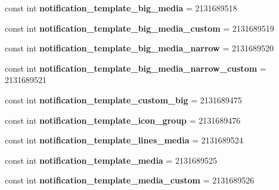 \begin{DoxyCompactItemize}
const int {\bfseries notification\+\_\+template\+\_\+big\+\_\+media} = 2131689518
\item 
\mbox{\label{classst_delivery_1_1_resource_1_1_layout_a74bc9923f45f25757e4d6ca1f4bee195}} 
const int {\bfseries notification\+\_\+template\+\_\+big\+\_\+media\+\_\+custom} = 2131689519
\item 
\mbox{\label{classst_delivery_1_1_resource_1_1_layout_afa76fe3140003e3059556030e24b266f}} 
const int {\bfseries notification\+\_\+template\+\_\+big\+\_\+media\+\_\+narrow} = 2131689520
\item 
\mbox{\label{classst_delivery_1_1_resource_1_1_layout_aa16cad60465fd9f461d30979c4a8de5d}} 
const int {\bfseries notification\+\_\+template\+\_\+big\+\_\+media\+\_\+narrow\+\_\+custom} = 2131689521
\item 
\mbox{\label{classst_delivery_1_1_resource_1_1_layout_a4e13b812d9fa03ff539879780fd55b9c}} 
const int {\bfseries notification\+\_\+template\+\_\+custom\+\_\+big} = 2131689475
\item 
\mbox{\label{classst_delivery_1_1_resource_1_1_layout_a366eb7b4d3f1929b20ea334dc36a16b7}} 
const int {\bfseries notification\+\_\+template\+\_\+icon\+\_\+group} = 2131689476
\item 
\mbox{\label{classst_delivery_1_1_resource_1_1_layout_a7f0f7b1c94d9ed79bfc7ce9c47d4f56e}} 
const int {\bfseries notification\+\_\+template\+\_\+lines\+\_\+media} = 2131689524
\item 
\mbox{\label{classst_delivery_1_1_resource_1_1_layout_a18e853700ee2ba961a45e1debd1a5eb4}} 
const int {\bfseries notification\+\_\+template\+\_\+media} = 2131689525
\item 
\mbox{\label{classst_delivery_1_1_resource_1_1_layout_ac59f13f61cab3ea4e9a9415a38ac0c54}} 
const int {\bfseries notification\+\_\+template\+\_\+media\+\_\+custom} = 2131689526
\item 

\end{DoxyCompactItemize}
